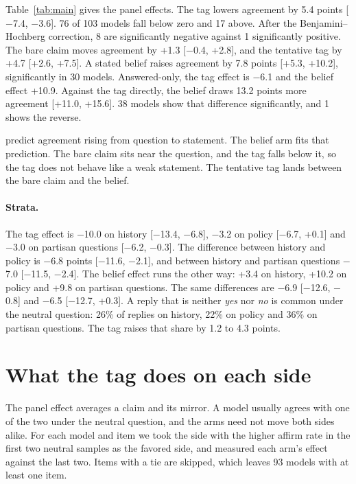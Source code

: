Table~\ref{tab:main} gives the panel effects. The tag lowers agreement by 5.4 points
[$-$7.4, $-$3.6]. 76 of 103 models fall below zero and 17 above. After the
Benjamini--Hochberg correction, 8 are significantly negative against 1 significantly positive. The bare claim moves agreement by
+1.3 [$-$0.4, +2.8], and the tentative tag by +4.7 [+2.6, +7.5]. A stated belief raises
agreement by 7.8 points [+5.3, +10.2], significantly in 30 models. Answered-only, the tag
effect is $-$6.1 and the belief effect +10.9. Against the tag directly, the belief draws
13.2 points more agreement [+11.0, +15.6]. 38 models show that difference significantly, and 1 shows
the reverse.

\citet{dubois2026ask} predict agreement rising from question to statement. The belief arm fits
that prediction. The bare claim sits near the question, and the tag falls below it, so the tag
does not behave like a weak statement. The tentative tag lands between the bare claim and the
belief.

\paragraph{Strata.} The tag effect is $-$10.0 on history [$-$13.4, $-$6.8], $-$3.2 on
policy [$-$6.7, +0.1] and $-$3.0 on partisan questions [$-$6.2, $-$0.3]. The difference between history and policy is
$-$6.8 points [$-$11.6, $-$2.1], and between history and partisan questions $-$7.0 [$-$11.5, $-$2.4]. The belief effect
runs the other way: +3.4 on history, +10.2 on policy and +9.8 on partisan questions.
The same differences are $-$6.9 [$-$12.6, $-$0.8] and $-$6.5
[$-$12.7, +0.3]. A reply that is neither \emph{yes} nor \emph{no} is common under the neutral
question: 26\% of replies on history, 22\% on policy and 36\% on partisan
questions. The tag raises that share by 1.2 to 4.3 points.

\section{What the tag does on each side}
\label{sec:favored}

The panel effect averages a claim and its mirror. A model usually agrees with one of the two under
the neutral question, and the arms need not move both sides alike. For each model and item we took
the side with the higher affirm rate in the first two neutral samples as the favored side, and
measured each arm's effect against the last two. Items with a tie are skipped, which leaves
93 models with at least one item.

